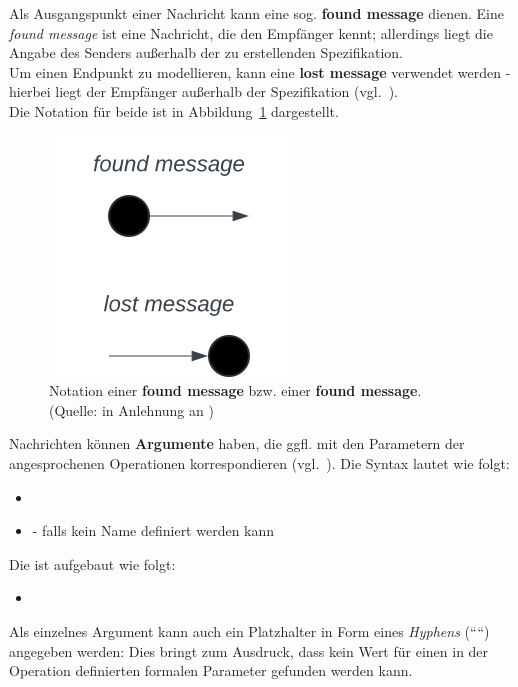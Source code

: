 \noindent
Als Ausgangspunkt einer Nachricht kann eine sog. \textbf{found message} dienen. Eine \textit{found message} ist eine Nachricht, die den Empfänger kennt; allerdings liegt die Angabe des Senders außerhalb der zu erstellenden Spezifikation.\\
Um einen Endpunkt zu modellieren, kann eine \textbf{lost message} verwendet werden - hierbei liegt der Empfänger außerhalb der Spezifikation  (vgl.~\cite[598]{OMG17}).\\
Die Notation für beide ist in Abbildung~\ref{fig:lost-found-message} dargestellt.

\begin{figure}
    \centering
    \includegraphics[scale=0.5]{part three/Sequenzdiagramme/img/lost-found-message}
    \caption{Notation einer \textbf{found message} bzw. einer \textbf{found message}. (Quelle: in Anlehnung an \cite[596]{OMG17})}
    \label{fig:lost-found-message}
\end{figure}

\noindent
Nachrichten können \textbf{Argumente} haben, die ggfl. mit den Parametern der angesprochenen Operationen korrespondieren (vgl.~\cite[32]{Buh09}).
Die Syntax lautet wie folgt:

\begin{itemize}
    \item {}
    \item \code{*} - falls kein Name definiert werden kann
\end{itemize}

\noindent
Die  ist aufgebaut wie folgt:

\begin{itemize}
    \item {}
\end{itemize}

\noindent
Als einzelnes Argument kann auch ein Platzhalter in Form eines \textit{Hyphens} (``\code{-}``) angegeben werden: Dies bringt zum Ausdruck, dass kein Wert für einen in der Operation definierten formalen Parameter gefunden werden kann.\\

